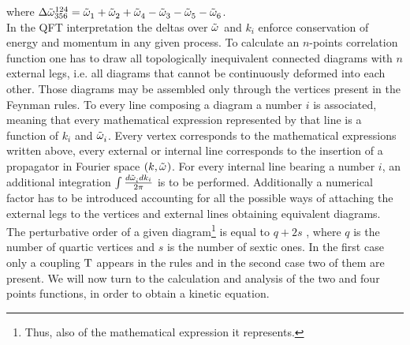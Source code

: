 \begin{center}
\end{center}
where $ \Delta{\tilde{\omega}}^{124}_{356} = \tilde{\omega}^{}_1 + \tilde{\omega}^{}_2 + \tilde{\omega}^{}_4 - \tilde{\omega}^{}_3 - \tilde{\omega}^{}_5 - \tilde{\omega}^{}_6$. \\

In the QFT interpretation the deltas over $\tilde{\omega}^{}$ and $k_i$ enforce conservation of energy and momentum in any given process. To calculate an $n$-points 
correlation function one has to draw all topologically inequivalent connected diagrams with $n$ external legs, i.e. all diagrams that cannot be continuously deformed into each other.
Those diagrams may be assembled only through the vertices present in the Feynman rules. To every line composing a diagram a number $i$ is associated,
meaning that every mathematical expression represented by that line is a function of $k_i$ and $\tilde{\omega}^{}_i$. Every vertex corresponds to the mathematical expressions 
written above, every external or internal line corresponds to the insertion of a propagator in Fourier space $(k, \tilde{\omega}^{})$. For every internal line bearing a number 
$i$, an additional integration $ \int \frac{d\tilde{\omega}^{}_i dk_i}{2\pi}$ is to be performed. Additionally a numerical factor has to be introduced accounting for all the possible 
ways of attaching the external legs to the vertices and external lines obtaining equivalent diagrams. \\
The perturbative order of a given diagram\footnote{Thus, also of the mathematical expression it represents.} is equal to $q + 2s$ , where $q$ is the number of quartic vertices 
and $s$ is the number of sextic ones. In the first case only a coupling $\mathrm{T}$ appears in the rules and in the second case two of them are present. 
We will now turn to the calculation and analysis of the two and four points functions, in order to obtain a kinetic equation. \\

